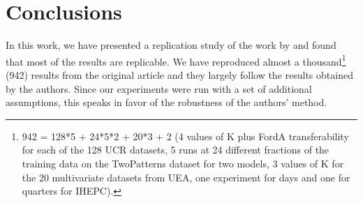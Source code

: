 

\section{Conclusions}
\label{conc}
In this work, we have presented a replication study of the work by \cite{FranceschiUnsupervised2019} and found that most of the results are replicable. We have reproduced almost a thousand\footnote{942 = 128*5 + 24*5*2 + 20*3 + 2 (4 values of K plus FordA transferability for each of the 128 UCR datasets, 5 runs at 24 different fractions of the training data on the TwoPatterns dataset for two models, 3 values of K for the 20 multivariate datasets from UEA, one experiment for days and one for quarters for IHEPC).} (942) results from the original article and they largely follow the results obtained by the authors. Since our experiments were run with a set of additional assumptions, this speaks in favor of the robustness of the authors' method.


%

